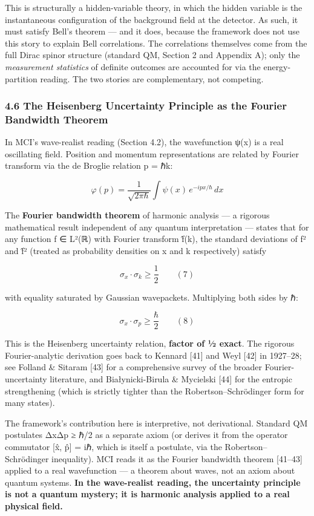 \documentclass[
]{article}
\begin{document}
This is structurally a hidden-variable theory, in which the hidden
variable is the instantaneous configuration of the background field at
the detector. As such, it must satisfy Bell's theorem --- and it does,
because the framework does not use this story to explain Bell
correlations. The correlations themselves come from the full Dirac
spinor structure (standard QM, Section 2 and Appendix A); only the
\emph{measurement statistics} of definite outcomes are accounted for via
the energy-partition reading. The two stories are complementary, not
competing.

\subsubsection{4.6 The Heisenberg Uncertainty Principle as the Fourier
Bandwidth
Theorem}\label{the-heisenberg-uncertainty-principle-as-the-fourier-bandwidth-theorem}

In MCI's wave-realist reading (Section 4.2), the wavefunction ψ(x) is a
real oscillating field. Position and momentum representations are
related by Fourier transform via the de Broglie relation p = ℏk:

\[\varphi(p) = \frac{1}{\sqrt{2\pi\hbar}} \int \psi(x)\, e^{-ipx/\hbar}\, dx\]

The \textbf{Fourier bandwidth theorem} of harmonic analysis --- a
rigorous mathematical result independent of any quantum interpretation
--- states that for any function f ∈ L²(ℝ) with Fourier transform f̂(k),
the standard deviations of \textbar f\textbar² and \textbar f̂\textbar²
(treated as probability densities on x and k respectively) satisfy

\[\sigma_x \cdot \sigma_k \geq \frac{1}{2} \qquad (7)\]

with equality saturated by Gaussian wavepackets. Multiplying both sides
by ℏ:

\[\boxed{\sigma_x \cdot \sigma_p \geq \frac{\hbar}{2}} \qquad (8)\]

This is the Heisenberg uncertainty relation, \textbf{factor of ½ exact}.
The rigorous Fourier-analytic derivation goes back to Kennard {[}41{]}
and Weyl {[}42{]} in 1927--28; see Folland \& Sitaram {[}43{]} for a
comprehensive survey of the broader Fourier-uncertainty literature, and
Białynicki-Birula \& Mycielski {[}44{]} for the entropic strengthening
(which is strictly tighter than the Robertson--Schrödinger form for many
states).

The framework's contribution here is interpretive, not derivational.
Standard QM postulates ΔxΔp ≥ ℏ/2 as a separate axiom (or derives it
from the operator commutator {[}x̂, p̂{]} = iℏ, which is itself a
postulate, via the Robertson--Schrödinger inequality). MCI reads it as
the Fourier bandwidth theorem {[}41--43{]} applied to a real
wavefunction --- a theorem about waves, not an axiom about quantum
systems. \textbf{In the wave-realist reading, the uncertainty principle
is not a quantum mystery; it is harmonic analysis applied to a real
physical field.}
\end{document}
